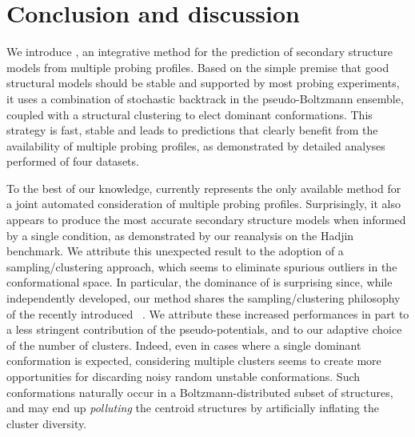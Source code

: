 \documentclass[a4,center,fleqn]{NAR}
\begin{document}










\section*{Conclusion and discussion}

We introduce \OurTool{}, an integrative method for the prediction of secondary structure models from multiple probing profiles. Based on the simple premise that good structural models should be stable and supported by most probing experiments, it uses a combination of stochastic backtrack in the pseudo-Boltzmann ensemble, coupled with a structural clustering to elect dominant conformations. This strategy is fast, stable and leads to predictions that clearly benefit from the availability of multiple probing profiles, as demonstrated by detailed analyses performed of four datasets. 


To the best of our knowledge, \OurTool currently represents the only available method for a joint automated consideration of multiple probing profiles. Surprisingly, it also appears to produce the most accurate secondary structure models when informed by a single condition, as demonstrated by our reanalysis on the Hadjin\etal\cite{Hajdin2013} benchmark. We attribute this unexpected result to the adoption of a sampling/clustering approach, which seems to eliminate spurious outliers in the conformational space. In particular, the dominance of \OurTool is surprising since, while independently developed, our method shares the sampling/clustering philosophy of the recently introduced ~\cite{Spasic2017}. We attribute these increased performances in part to a less stringent contribution of the pseudo-potentials, and to our adaptive choice of the number of clusters. Indeed, even in cases where a single dominant conformation is expected, considering multiple clusters seems to create more opportunities for discarding noisy random unstable conformations. Such conformations naturally occur in a Boltzmann-distributed subset of structures, and may end up \emph{polluting} the centroid structures by artificially inflating the cluster diversity. 
\end{document}
